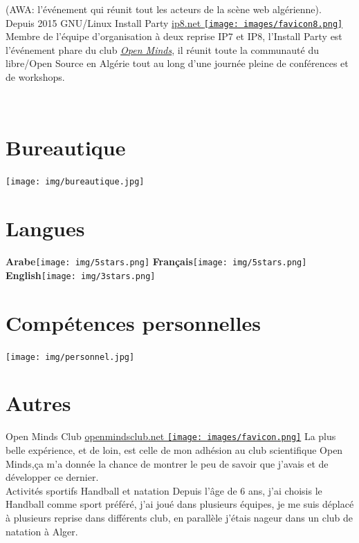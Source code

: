 \documentclass[]{friggeri-cv}
\begin{document}
\begin{entrylist}
{    (AWA: l’événement qui réunit tout les acteurs de la scène web algérienne).\\}
  \entry
    {Depuis 2015}
    {GNU/Linux Install Party}
    {\href{https://www.openmindsclub.net/ip8}{ip8.net \texttt{[image: images/favicon8.png]}}}
    {Membre de l'équipe d'organisation à deux reprise IP7 et IP8, l'Install Party est l’événement phare du club \href{http://www.openmindsclub.net/}{\emph{Open Minds}}, il réunit toute la communauté du libre/Open Source en Algérie tout au long d'une journée pleine de conférences et de workshops.\\}
    
\end{entrylist}

\begin{aside}
~
~
~
~
  \section{Bureautique}
    \texttt{[image: img/bureautique.jpg]}
    ~
    ~
  \section{Langues}
    \textbf{Arabe}\texttt{[image: img/5stars.png]}
    \textbf{Français}\texttt{[image: img/5stars.png]}
    \textbf{English}\texttt{[image: img/3stars.png]}
    ~
    ~
  \section{Compétences personnelles}
    \texttt{[image: img/personnel.jpg]}
    ~
\end{aside}

\section{Autres}
\begin{entrylist}
   \entry
    { }
    {Open Minds Club}
    {\href{http://www.openmindsclub.net}{openmindsclub.net \texttt{[image: images/favicon.png]}}}
    {La plus belle expérience, et de loin, est celle de mon adhésion au club scientifique Open Minds,ça m'a donnée la chance de montrer le peu de savoir que j'avais et de développer ce dernier.\\}
  \entry
    { }
    {Activités sportifs}
    {Handball et natation}
    {Depuis l'âge de 6 ans, j'ai choisis le Handball comme sport préféré, j'ai joué dans plusieurs équipes, je me suis déplacé à plusieurs reprise dans différents club, en parallèle j'étais nageur dans un club de natation à Alger.\\}
\end{entrylist}
\end{document}
